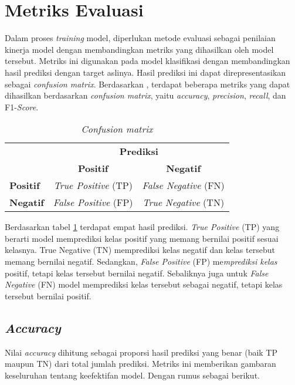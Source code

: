 \section{Metriks Evaluasi}

Dalam proses \textit{training} model, diperlukan metode evaluasi sebagai penilaian kinerja model dengan membandingkan metriks yang dihasilkan oleh model tersebut. Metriks ini digunakan pada model klasifikasi dengan membandingkan hasil prediksi dengan target aslinya. Hasil prediksi ini dapat direpresentasikan sebagai \textit{confusion matrix}. Berdasarkan \citeauthor{metrics}, terdapat beberapa metriks yang dapat dihasilkan berdasarkan \textit{confusion matrix}, yaitu \textit{accuracy}, \textit{precision}, \textit{recall}, dan F1-\textit{Score}.

\begin{table}[ht]
\centering
\caption{\textit{Confusion matrix}}
\label{confusion-matrix}
\begin{tabular}{|l|c|c|}
\hline
\rowcolor{black!10}
\multicolumn{1}{|c|}{\textbf{Target}} & \multicolumn{2}{c|}{\textbf{Prediksi}} \\ \cline{2-3} 
\rowcolor{black!10}
& \textbf{Positif} & \textbf{Negatif} \\ \hline
\textbf{Positif} & \textit{True Positive} (TP) & \textit{False Negative} (FN) \\ \hline
\textbf{Negatif} & \textit{False Positive} (FP) & \textit{True Negative} (TN) \\ \hline
\end{tabular}
\end{table}

Berdasarkan tabel \ref{confusion-matrix} terdapat empat hasil prediksi. \textit{True Positive} (TP) yang berarti model memprediksi kelas positif yang memang bernilai positif sesuai kelasnya. True Negative (TN) memprediksi kelas negatif dan kelas tersebut memang bernilai negatif. Sedangkan, \textit{False Positive} (FP) me\textit{mprediksi kelas} positif, tetapi kelas tersebut bernilai negatif. Sebaliknya juga untuk \textit{False Negative} (FN) model memprediksi kelas tersebut sebagai negatif, tetapi kelas tersebut bernilai positif.

\subsection{\textit{Accuracy}}
Nilai \textit{accuracy} dihitung sebagai proporsi hasil prediksi yang benar (baik TP maupun TN) dari total jumlah prediksi. Metriks ini memberikan gambaran keseluruhan tentang keefektifan model. Dengan rumus sebagai berikut.

